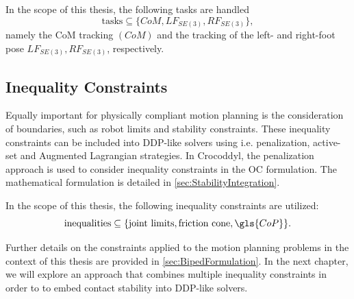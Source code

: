In the scope of this thesis, the following tasks are handled
\begin{equation}
\text{tasks} \subseteq \{CoM, LF_{SE(3)}, RF_{SE(3)}\}, 
\end{equation}
namely the \gls{CoM} tracking $(CoM)$ and the tracking of the left- and right-foot pose $LF_{SE(3)}, RF_{SE(3)}$, respectively.

\subsection{Inequality Constraints}
Equally important for physically compliant motion planning is the consideration of boundaries, such as robot limits and stability constraints. These inequality constraints can be included into \gls{DDP}-like solvers using i.e. penalization, active-set \cite{xie2017differential} and Augmented Lagrangian \cite{howell2019altro} strategies. In Crocoddyl, the penalization approach is used to consider inequality constraints in the \gls{OC} formulation. The mathematical formulation is detailed in \cref{sec:StabilityIntegration}. 

In the scope of this thesis, the following inequality constraints are utilized:
\begin{equation}
\text{inequalities} \subseteq \{\text{joint limits}, \text{friction cone}, \gls{CoP}\}.
\end{equation}

Further details on the constraints applied to the motion planning problems in the context of this thesis are provided in \cref{sec:BipedFormulation}. In the next chapter, we will explore an approach that combines multiple inequality constraints in order to to embed contact stability into \gls{DDP}-like solvers. 